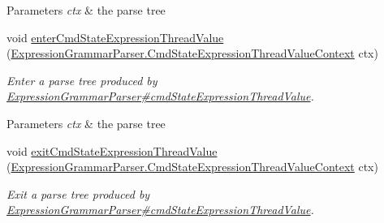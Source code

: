 \begin{DoxyCompactItemize}
\begin{DoxyCompactList}
\begin{DoxyParams}{Parameters}
{\em ctx} & the parse tree\\
\hline
\end{DoxyParams}
 \end{DoxyCompactList}\item 
void \hyperlink{classgov_1_1nasa_1_1jpf_1_1inspector_1_1server_1_1expression_1_1parser_1_1_expression_grammar_base_listener_a0d40b5604fc981e7f87b2aa11ff8379a}{enter\+Cmd\+State\+Expression\+Thread\+Value} (\hyperlink{classgov_1_1nasa_1_1jpf_1_1inspector_1_1server_1_1expression_1_1parser_1_1_expression_grammar_pa5a19a4a13564890289bc65b6a0372f78}{Expression\+Grammar\+Parser.\+Cmd\+State\+Expression\+Thread\+Value\+Context} ctx)
\begin{DoxyCompactList}\small\item\em Enter a parse tree produced by \hyperlink{classgov_1_1nasa_1_1jpf_1_1inspector_1_1server_1_1expression_1_1parser_1_1_expression_grammar_parser_aa83127fe4f65f96d5da73e78c7bbae2f}{Expression\+Grammar\+Parser\#cmd\+State\+Expression\+Thread\+Value}.


\begin{DoxyParams}{Parameters}
{\em ctx} & the parse tree\\
\hline
\end{DoxyParams}
 \end{DoxyCompactList}\item 
void \hyperlink{classgov_1_1nasa_1_1jpf_1_1inspector_1_1server_1_1expression_1_1parser_1_1_expression_grammar_base_listener_a6afb6a86db327f5077a39ea66b81430e}{exit\+Cmd\+State\+Expression\+Thread\+Value} (\hyperlink{classgov_1_1nasa_1_1jpf_1_1inspector_1_1server_1_1expression_1_1parser_1_1_expression_grammar_pa5a19a4a13564890289bc65b6a0372f78}{Expression\+Grammar\+Parser.\+Cmd\+State\+Expression\+Thread\+Value\+Context} ctx)
\begin{DoxyCompactList}\small\item\em Exit a parse tree produced by \hyperlink{classgov_1_1nasa_1_1jpf_1_1inspector_1_1server_1_1expression_1_1parser_1_1_expression_grammar_parser_aa83127fe4f65f96d5da73e78c7bbae2f}{Expression\+Grammar\+Parser\#cmd\+State\+Expression\+Thread\+Value}.



\end{DoxyCompactList}
\end{DoxyCompactItemize}
